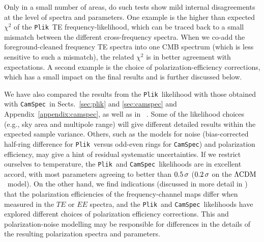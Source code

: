 \documentclass[longauth,traditabstract]{aa}
\def\,{\thinspace}
\newcommand{\camspec}{{\tt CamSpec}}
\newcommand{\plik}{{\tt Plik}}
\providecommand{\LCDM}{{$\rm{\Lambda CDM}$}}
\newcommand{\likeIII}{\citetalias{planck2016-l05}}
\begin{document}
{Only in a small number of areas, do such tests show mild internal disagreements at the level of spectra and parameters. 
One example is the higher than expected $\chi^2$ of the \plik\ TE frequency-likelihood, which can be traced back to a small mismatch between the different cross-frequency spectra. When we co-add the foreground-cleaned frequency TE  spectra into one CMB spectrum (which is less sensitive to such a mismatch), the related $\chi^2$ is in better agreement with expectations. A second example is the choice of polarization-efficiency corrections, which has a small impact on the final results and is further discussed below.

We have also compared the results from the \plik\ likelihood with those obtained with \camspec\ in Sects.~\ref{sec:plik} and \ref{sec:camspec} and Appendix~\ref{appendix:camspec}, as well as in \likeIII\ \citep[see also][]{Efstathiou:2019}. 
Some of the likelihood choices (e.g., sky area and multipole range) will give different detailed results within the expected sample variance. 
Others, such as the models for noise (bias-corrected half-ring difference for \plik\ versus odd-even rings for \camspec) and polarization efficiency, may give a hint of residual systematic uncertainties. 
If we restrict ourselves to temperature, the \plik\ and \camspec\ likelihoods are in excellent accord, with most parameters agreeing to better than $0.5\,\sigma$ ($0.2\,\sigma$ on the \LCDM\ model). 
On the other hand, we find indications (discussed in more detail in \likeIII) that the polarization efficiencies of the frequency-channel maps differ when measured in the $TE$ or $EE$ spectra, and the \plik\ and \camspec\ likelihoods have explored different choices of polarization efficiency corrections. This and polarization-noise modelling may be responsible for differences in the details of the resulting polarization spectra and parameters.

}
\end{document}

